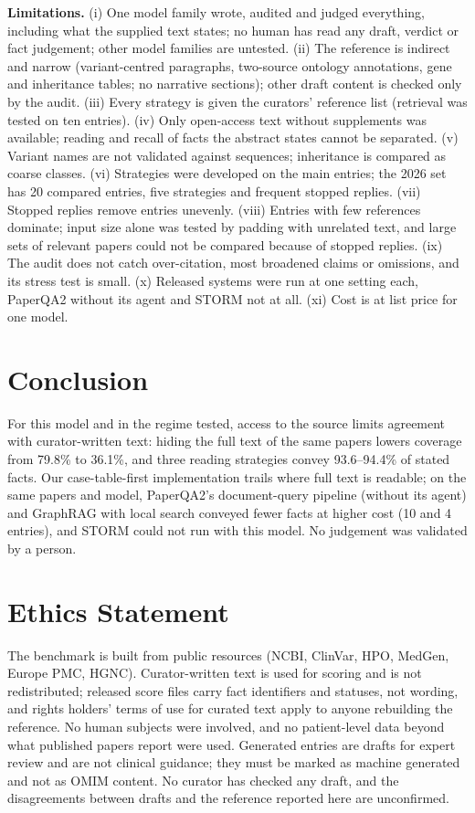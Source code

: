 \documentclass{article} %
\begin{document}
\textbf{Limitations.} (i) One model family wrote, audited and judged everything, including what the supplied text states; no human has read any draft, verdict or fact judgement; other model families are untested. (ii) The reference is indirect and narrow (variant-centred paragraphs, two-source ontology annotations, gene and inheritance tables; no narrative sections); other draft content is checked only by the audit. (iii) Every strategy is given the curators' reference list (retrieval was tested on ten entries). (iv) Only open-access text without supplements was available; reading and recall of facts the abstract states cannot be separated. (v) Variant names are not validated against sequences; inheritance is compared as coarse classes. (vi) Strategies were developed on the main entries; the 2026 set has 20 compared entries, five strategies and frequent stopped replies. (vii) Stopped replies remove entries unevenly. (viii) Entries with few references dominate; input size alone was tested by padding with unrelated text, and large sets of relevant papers could not be compared because of stopped replies. (ix) The audit does not catch over-citation, most broadened claims or omissions, and its stress test is small. (x) Released systems were run at one setting each, PaperQA2 without its agent and STORM not at all. (xi) Cost is at list price for one model.

\section{Conclusion}
\label{sec:conclusion}
For this model and in the regime tested, access to the source limits agreement with curator-written text: hiding the full text of the same papers lowers coverage from 79.8\% to 36.1\%, and three reading strategies convey 93.6--94.4\% of stated facts. Our case-table-first implementation trails where full text is readable; on the same papers and model, PaperQA2's document-query pipeline (without its agent) and GraphRAG with local search conveyed fewer facts at higher cost (10 and 4 entries), and STORM could not run with this model. No judgement was validated by a person.

\section*{Ethics Statement}
The benchmark is built from public resources (NCBI, ClinVar, HPO, MedGen, Europe PMC, HGNC). Curator-written text is used for scoring and is not redistributed; released score files carry fact identifiers and statuses, not wording, and rights holders' terms of use for curated text apply to anyone rebuilding the reference. No human subjects were involved, and no patient-level data beyond what published papers report were used. Generated entries are drafts for expert review and are not clinical guidance; they must be marked as machine generated and not as OMIM content. No curator has checked any draft, and the disagreements between drafts and the reference reported here are unconfirmed.
\end{document}
